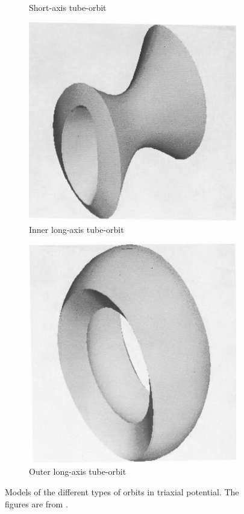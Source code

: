 \documentclass[english, twoside]{HYgradu}
\begin{document}
\begin{figure}
\begin{subfigure}[b]{0.49\textwidth}
		\caption{Short-axis tube-orbit}
	\end{subfigure}
	\begin{subfigure}[b]{0.49\textwidth}
		\includegraphics[width=\textwidth]{statler_long_inner.png}
		\caption{Inner long-axis tube-orbit}
	\end{subfigure}
	\begin{subfigure}[b]{0.49\textwidth}
		\includegraphics[width=\textwidth]{statler_long_outer.png}
		\caption{Outer long-axis tube-orbit}
	\end{subfigure}
	\caption{Models of the different types of orbits in triaxial potential. The figures are from \cite{Statler1987}.}
	\label{figure:triaxial_orbits}
\end{figure}
\end{document}

